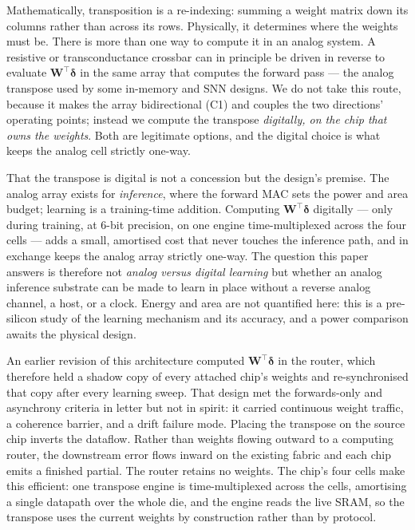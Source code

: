 \documentclass[11pt]{article}
\begin{document}
Mathematically, transposition is a re-indexing: summing a weight matrix
down its columns rather than across its rows. Physically, it determines
where the weights must be. There is more than one way to compute it in
an analog system. A resistive or transconductance crossbar can in
principle be driven in reverse to evaluate \(\bm W^{\!\top}\bm\delta\)
in the same array that computes the forward pass --- the analog
transpose used by some in-memory and SNN designs. We do not take this
route, because it makes the array bidirectional (C1) and couples the two
directions' operating points; instead we compute the transpose
\emph{digitally, on the chip that owns the weights}. Both are legitimate
options, and the digital choice is what keeps the analog cell strictly
one-way.

That the transpose is digital is not a concession but the design's
premise. The analog array exists for \emph{inference}, where the forward
MAC sets the power and area budget; learning is a training-time
addition. Computing \(\bm W^{\!\top}\bm\delta\) digitally --- only
during training, at 6-bit precision, on one engine time-multiplexed
across the four cells --- adds a small, amortised cost that never
touches the inference path, and in exchange keeps the analog array
strictly one-way. The question this paper answers is therefore not
\emph{analog versus digital learning} but whether an analog inference
substrate can be made to learn in place without a reverse analog
channel, a host, or a clock. Energy and area are not quantified here:
this is a pre-silicon study of the learning mechanism and its accuracy,
and a power comparison awaits the physical design.

An earlier revision of this architecture computed
\(\bm W^{\!\top}\bm\delta\) in the router, which therefore held a shadow
copy of every attached chip's weights and re-synchronised that copy
after every learning sweep. That design met the forwards-only and
asynchrony criteria in letter but not in spirit: it carried continuous
weight traffic, a coherence barrier, and a drift failure mode. Placing
the transpose on the source chip inverts the dataflow. Rather than
weights flowing outward to a computing router, the downstream error
flows inward on the existing fabric and each chip emits a finished
partial. The router retains no weights. The chip's four cells make this
efficient: one transpose engine is time-multiplexed across the cells,
amortising a single datapath over the whole die, and the engine reads
the live SRAM, so the transpose uses the current weights by construction
rather than by protocol.
\end{document}
